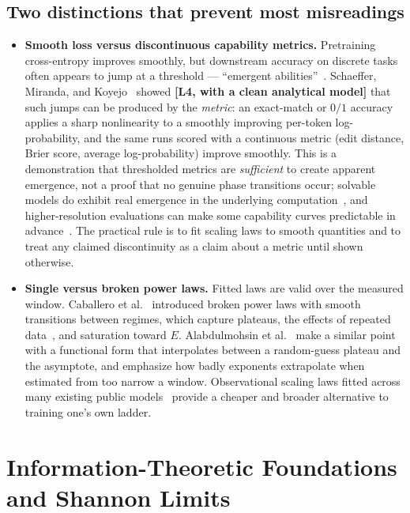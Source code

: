 \documentclass[11pt,a4paper]{article}
\theoremstyle{definition}
\begin{document}
\subsection{Two distinctions that prevent most misreadings}

\begin{itemize}[leftmargin=1.5em]
  \item \textbf{Smooth loss versus discontinuous capability metrics.} Pretraining cross-entropy improves smoothly, but downstream accuracy on discrete tasks often appears to jump at a threshold --- ``emergent abilities''~\cite{wei2022emergent}. Schaeffer, Miranda, and Koyejo~\cite{schaeffer2023mirage} showed \textbf{[L4, with a clean analytical model]} that such jumps can be produced by the \emph{metric}: an exact-match or $0/1$ accuracy applies a sharp nonlinearity to a smoothly improving per-token log-probability, and the same runs scored with a continuous metric (edit distance, Brier score, average log-probability) improve smoothly. This is a demonstration that thresholded metrics are \emph{sufficient} to create apparent emergence, not a proof that no genuine phase transitions occur; solvable models do exhibit real emergence in the underlying computation~\cite{nam2024exactly,michaud2023quantization}, and higher-resolution evaluations can make some capability curves predictable in advance~\cite{hu2024predicting,arora2023theory}. The practical rule is to fit scaling laws to smooth quantities and to treat any claimed discontinuity as a claim about a metric until shown otherwise.
  \item \textbf{Single versus broken power laws.} Fitted laws are valid over the measured window. Caballero et al.~\cite{caballero2023broken} introduced broken power laws with smooth transitions between regimes, which capture plateaus, the effects of repeated data~\cite{muennighoff2023scaling}, and saturation toward $E$. Alabdulmohsin et al.~\cite{alabdulmohsin2022revisiting} make a similar point with a functional form that interpolates between a random-guess plateau and the asymptote, and emphasize how badly exponents extrapolate when estimated from too narrow a window. Observational scaling laws fitted across many existing public models~\cite{ruan2024observational} provide a cheaper and broader alternative to training one's own ladder.
\end{itemize}

\section{Information-Theoretic Foundations and Shannon Limits}
\label{sec:shannon_theory}
\end{document}
